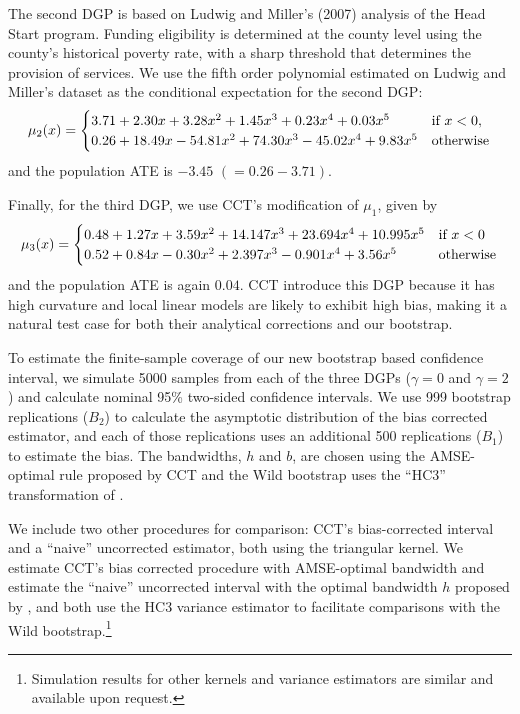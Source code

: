 \documentclass[12pt,fleqn]{article}
\begin{document}
\nocite{ludwig2007}%
The second DGP is based on Ludwig and Miller's (2007) analysis of the Head Start
program. Funding eligibility is determined at the county level using the
county's historical poverty rate, with a sharp threshold that determines the
provision of services. We use the fifth order polynomial estimated on Ludwig and
Miller's dataset as the conditional expectation for the second DGP:
\begin{equation*}
  \mu_{2}(x) =
  \begin{cases}
    3.71 + 2.30x + 3.28x^2 + 1.45x^3 + 0.23x^4 + 0.03x^5
    & \text{if}\ x < 0, \\
    0.26 + 18.49x - 54.81x^2 + 74.30x^3 - 45.02x^4 + 9.83x^5
    & \text{otherwise}
  \end{cases}
\end{equation*}
and the population ATE is $-3.45$ $(= 0.26 - 3.71)$.

Finally, for the third DGP, we use CCT's modification of $\mu_1$, given by
\begin{equation*}
  \mu_{3}(x) =
  \begin{cases}
    0.48 + 1.27x + 3.59 x^{2} + 14.147 x^3 + 23.694 x^4 + 10.995 x^5
    & \text{if}\ x < 0 \\
    0.52 + 0.84x - 0.30 x^{2} + 2.397 x^3 - 0.901 x^4 + 3.56 x^5
    & \text{otherwise}
\end{cases}
\end{equation*}
and the population ATE is again $0.04$. CCT introduce this DGP because it has
high curvature and local linear models are likely to exhibit high bias, making
it a natural test case for both their analytical corrections and our bootstrap.

To estimate the finite-sample coverage of our new bootstrap based confidence interval, we
simulate 5000 samples from each of the three DGPs ($\gamma = 0$ and $\gamma = 2$) and calculate nominal 95\%
two-sided confidence intervals. We use 999 bootstrap replications ($B_2$) to
calculate the asymptotic distribution of the bias corrected estimator, and each
of those replications uses an additional 500 replications ($B_1$) to estimate
the bias. The bandwidths, $h$ and $b$,
are chosen using the AMSE-optimal rule proposed by CCT and the Wild bootstrap
uses the ``HC3'' transformation of \citet{DF08}.

We include two other procedures for comparison: CCT's bias-corrected interval
and a ``naive'' uncorrected estimator, both using the triangular kernel. We
estimate CCT's bias corrected procedure with AMSE-optimal bandwidth and estimate
the ``naive'' uncorrected interval with the optimal bandwidth $h$ proposed by
\cite{IK}, and both use the HC3 variance estimator to facilitate comparisons
with the Wild bootstrap.\footnote{%
  Simulation results for other kernels and variance estimators are similar and
  available upon request.} %
\end{document}
